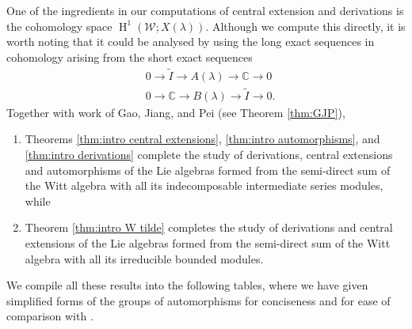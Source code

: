 \documentclass[11pt, svgnames]{amsart}
\newcommand{\CC}{\mathbb{C}}
\newcommand{\W}{\mathcal{W}}
\DeclareMathOperator{\HH}{H}
\theoremstyle{definition}
\begin{document}
One of the ingredients in our computations of central extension and derivations is the cohomology space $\HH^1(\W;X(\lambda))$. Although we compute this directly, it is worth noting that it could be analysed by using the long exact sequences in cohomology arising from the short exact sequences
\begin{align*}
    &0 \to \widetilde{I} \to A(\lambda) \to \CC \to 0 \\
    &0 \to \CC \to B(\lambda) \to \widetilde{I} \to 0.
\end{align*}
Together with work of Gao, Jiang, and Pei \cite{GaoJiangPei} (see Theorem \ref{thm:GJP}),
\begin{enumerate}
    \item Theorems \ref{thm:intro central extensions}, \ref{thm:intro automorphisms}, and \ref{thm:intro derivations} complete the study of derivations, central extensions and automorphisms of the Lie algebras formed from the semi-direct sum of the Witt algebra with all its indecomposable intermediate series modules, while
    \item Theorem \ref{thm:intro W tilde} completes the study of derivations and central extensions of the Lie algebras formed from the semi-direct sum of the Witt algebra with all its irreducible bounded modules.
\end{enumerate}
 We compile all these results into the following tables, where we have given simplified forms of the groups of automorphisms for conciseness and for ease of comparison with \cite[Theorem 5.2]{GaoJiangPei}.
\end{document}
